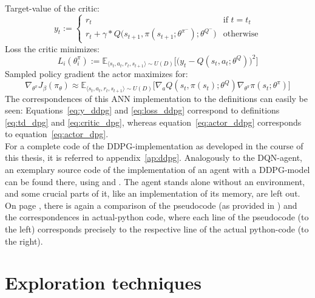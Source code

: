\noindent Target-value of the critic:
\begin{equation} \label{eq:y_ddpg}
	y_t := \begin{cases} 
	r_t & \text{if } t = t_t\\
	r_t + \gamma * Q\big(s_{t+1}, \pi(s_{t+1};\theta^{\pi^-});\theta^{Q^-} \big)  & \text{otherwise} 
	\end{cases} %
\end{equation}
\noindent Loss the critic minimizes:
\begin{equation} \label{eq:loss_ddpg}
	L_i(\theta^\pi_i) := \mathds{E}_{\langle s_t,a_t,r_t,s_{t+1} \rangle \sim U(D)} \Big[\Big( y_t - Q(s_t,a_t;\theta^Q) \Big)^2\Big]
\end{equation}
\noindent Sampled policy gradient the actor maximizes for:
\begin{equation} \label{eq:actor_ddpg}
	\nabla_{\theta^\pi}J_\beta(\pi_\theta) \approx \mathds{E}_{\langle s_t,a_t,r_t,s_{t+1} \rangle \sim U(D)} \Big[ \nabla_a Q(s_t,\pi(s_t);\theta^Q) \nabla_{\theta^\pi} \pi(s_t;\theta^\pi) \Big]
\end{equation}
The correspondences of this ANN implementation to the definitions can easily be seen: Equations~\ref{eq:y_ddpg} and \ref{eq:loss_ddpg} correspond to definitions \ref{eq:td_dpg} and \ref{eq:critic_dpg}, whereas equation~\ref{eq:actor_ddpg} corresponds to equation~\ref{eq:actor_dpg}.\\

For a complete code of the DDPG-implementation as developed in the course of this thesis, it is referred to appendix~\ref{ap:ddpg}. Analogously to the DQN-agent, an exemplary source code of the implementation of an agent with a DDPG-model can be found there, using  and . The agent stands alone without an environment, and some crucial parts of it, like an implementation of its memory, are left out. On page \pageref{ap:ddpg_comparison}, there is again a comparison of the pseudocode (as provided in \cite{lillicrap_continuous_2015}) and the correspondences in actual-python code, where each line of the pseudocode (to the left) corresponds precisely to the respective line of the actual python-code (to the right).



\section{Exploration techniques}


